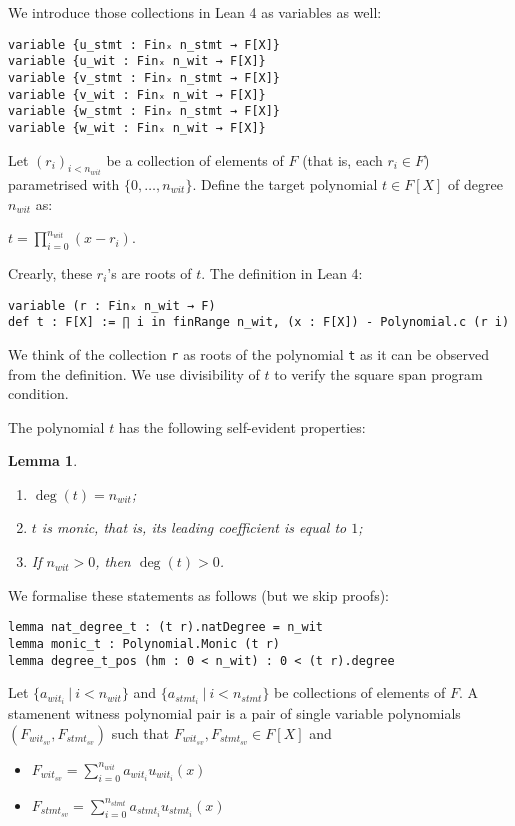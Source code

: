 \documentclass{article}
\newtheorem{lemma}{Lemma}
\theoremstyle{definition}
\theoremstyle{remark}
\begin{document}
We introduce those collections in Lean 4 as variables as well:

\begin{lstlisting}
variable {u_stmt : Finₓ n_stmt → F[X]}
variable {u_wit : Finₓ n_wit → F[X]}
variable {v_stmt : Finₓ n_stmt → F[X]}
variable {v_wit : Finₓ n_wit → F[X]}
variable {w_stmt : Finₓ n_stmt → F[X]}
variable {w_wit : Finₓ n_wit → F[X]}
\end{lstlisting}

Let $(r_i)_{i < n_{wit}}$ be a collection of elements of $F$ (that is, each $r_i \in F$) parametrised with $\{0, \dots, n_{wit} \}$.
Define the target polynomial $t \in F[X]$ of degree $n_{wit}$ as:
\begin{center}
$t = \prod \limits_{i = 0}^{n_{wit}} (x - r_i)$.
\end{center}

Crearly, these $r_i$'s are roots of $t$. The definition in Lean 4:
\begin{lstlisting}
variable (r : Finₓ n_wit → F)
def t : F[X] := ∏ i in finRange n_wit, (x : F[X]) - Polynomial.c (r i)
\end{lstlisting}

We think of the collection \verb"r" as roots of the polynomial \verb"t" as it can be observed from the definition.
We use divisibility of $t$ to verify the square span program condition.

The polynomial $t$ has the following self-evident properties:

\begin{lemma}
$ $

\begin{enumerate}
\item $\deg(t) = n_{wit}$;
\item $t$ is monic, that is, its leading coefficient is equal to $1$;
\item If $n_{wit} > 0$, then $\deg(t) > 0$.
\end{enumerate}
\end{lemma}

We formalise these statements as follows (but we skip proofs):
\begin{lstlisting}
lemma nat_degree_t : (t r).natDegree = n_wit
lemma monic_t : Polynomial.Monic (t r)
lemma degree_t_pos (hm : 0 < n_wit) : 0 < (t r).degree
\end{lstlisting}

Let $\{ a_{{wit}_i} \: | \: i < n_{wit}\}$ and $\{ a_{{stmt}_i} \: | \: i < n_{stmt} \}$ be collections of elements of $F$.
A stamenent witness polynomial pair is a pair of single variable polynomials $(F_{{wit}_{sv}}, F_{{stmt}_{sv}})$
such that $F_{{wit}_{sv}}, F_{{stmt}_{sv}} \in F[X]$ and
\begin{itemize}
\item $F_{{wit}_{sv}} = \sum \limits_{i = 0}^{n_{wit}} a_{{wit}_i} u_{{wit}_{i}}(x)$
\item $F_{{stmt}_{sv}} = \sum \limits_{i = 0}^{n_{stmt}} a_{{stmt}_i} u_{{stmt}_{i}}(x)$
\end{itemize}
\end{document}

